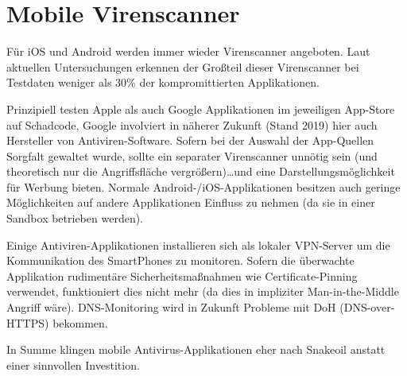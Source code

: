 \chapter{Mobile Virenscanner}

Für iOS und Android werden immer wieder Virenscanner angeboten. Laut aktuellen Untersuchungen erkennen der Großteil dieser Virenscanner bei Testdaten weniger als 30\% der kompromittierten Applikationen.

Prinzipiell testen Apple als auch Google Applikationen im jeweiligen App-Store auf Schadcode, Google involviert in näherer Zukunft (Stand 2019) hier auch Hersteller von Antiviren-Software. Sofern bei der Auswahl der App-Quellen Sorgfalt gewaltet wurde, sollte ein separater Virenscanner unnötig sein (und theoretisch nur die Angriffsfläche vergrößern)\ldots und eine Darstellungsmöglichkeit für Werbung bieten. Normale Android-/iOS-Applikationen besitzen auch geringe Möglichkeiten auf andere Applikationen Einfluss zu nehmen (da sie in einer Sandbox betrieben werden).

Einige Antiviren-Applikationen installieren sich als lokaler VPN-Server um die Kommunikation des SmartPhones zu monitoren. Sofern die überwachte Applikation rudimentäre Sicherheitsmaßnahmen wie Certificate-Pinning verwendet, funktioniert dies nicht mehr (da dies in impliziter Man-in-the-Middle Angriff wäre). DNS-Monitoring wird in Zukunft Probleme mit DoH (DNS-over-HTTPS) bekommen.

In Summe klingen mobile Antivirus-Applikationen eher nach Snakeoil anstatt einer sinnvollen Investition.
